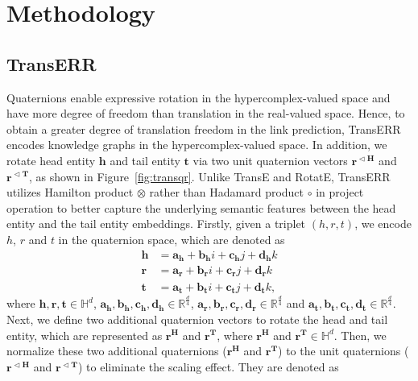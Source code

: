 \documentclass[11pt]{article}
\begin{document}
\section{Methodology}

\subsection{TransERR}\label{sec4.1}
Quaternions enable expressive rotation in the hypercomplex-valued space and have more degree of freedom than translation in the real-valued space. Hence, to obtain a greater degree of translation freedom in the link prediction, TransERR encodes knowledge graphs in the hypercomplex-valued space. In addition, we rotate head entity $\mathbf{h}$ and tail entity $\mathbf{t}$ via two unit quaternion vectors $\mathbf{r^{\vartriangleleft H}}$ and $\mathbf{r^{\vartriangleleft T}}$, as shown in Figure~\ref{fig:transqr}. Unlike TransE and RotatE, TransERR utilizes Hamilton product $\otimes$ rather than Hadamard product $\circ$ in project operation to better capture  the underlying semantic features between the head entity and the tail entity embeddings. Firstly, given a triplet $(h,r,t)$, we encode $h$, $r$ and $t$ in the quaternion space, which are denoted as
\begin{equation}
	\begin{aligned}
		\mathbf{h} & = \mathbf{a_h}+\mathbf{b_h}i+\mathbf{c_h}j+\mathbf{d_h}k   \\
		\mathbf{r} & = \mathbf{a_r}+\mathbf{b_r}i+\mathbf{c_r}j+\mathbf{d_r}k   \\
		\mathbf{t} & = \mathbf{a_t}+\mathbf{b_t}i+\mathbf{c_t}j+\mathbf{d_t}k,
	\end{aligned}
\end{equation}
where $\mathbf{h},\mathbf{r},\mathbf{t} \in\mathbb{H}^{d}$, $\mathbf{a_h},\mathbf{b_h}, \mathbf{c_h}, \mathbf{d_h} \in \mathbb{R}^{\frac{d}{4}}$, $\mathbf{a_r},\mathbf{b_r}, \mathbf{c_r}, \mathbf{d_r} \in \mathbb{R}^{\frac{d}{4}}$ and $\mathbf{a_t},\mathbf{b_t}, \mathbf{c_t}, \mathbf{d_t} \in \mathbb{R}^{\frac{d}{4}}$. Next, we define two additional quaternion vectors to  rotate the head and tail entity, which are represented as $\mathbf{r^H}$ and $\mathbf{r^T}$, where $\mathbf{r^H}$ and $\mathbf{r^T} \in\mathbb{H}^{d}$. Then, we normalize these two additional quaternions ($\mathbf{r^H}$ and $\mathbf{r^T}$) to the unit quaternions ($\mathbf{r^{\vartriangleleft H}}$ and $\mathbf{r^{\vartriangleleft T}}$) to eliminate the scaling effect. They are denoted as
\end{document}
